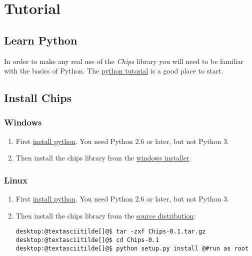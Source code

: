 \documentclass[letterpaper,10pt,english]{manual}
\begin{document}
\resetcurrentobjects
\hypertarget{--doc-tutorial/index}{}

\chapter{Tutorial}


\section{Learn Python}

In order to make any real use of the \emph{Chips} library you will need to be
familiar with the basics of Python. The \href{http://docs.python.org/tut}{python tutorial} is a good place
to start.


\section{Install Chips}


\subsection{Windows}
\begin{enumerate}
\item {} 
First \href{http://python.org/download}{install python}. You need Python 2.6 or later, but not Python 3.

\item {} 
Then install the chips library from the \href{http://github.com/dawsonjon/chips}{windows installer}.

\end{enumerate}


\subsection{Linux}
\begin{enumerate}
\item {} 
First \href{http://python.org/download}{install python}. You need Python 2.6 or later, but not Python 3.

\item {} 
Then install the chips library from the \href{http://github.com/dawsonjon/chips}{source distribution}:

\begin{Verbatim}[commandchars=@\[\]]
desktop:@textasciitilde[]@$ tar -zxf Chips-0.1.tar.gz
desktop:@textasciitilde[]@$ cd Chips-0.1
desktop:@textasciitilde[]@$ python setup.py install @#run as root
\end{Verbatim}

\end{enumerate}
\end{document}
